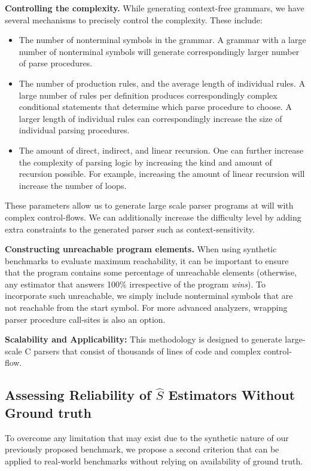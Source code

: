 \documentclass[conference,anonymous,review]{IEEEtran}
\begin{document}
\noindent\textbf{Controlling the complexity.} 
While generating context-free grammars, we have several mechanisms to
precisely control the complexity. These include:
\begin{itemize}
\item The number of nonterminal symbols in the grammar. A grammar with a large number of nonterminal symbols will generate correspondingly larger number of parse procedures.
\item The number of production rules, and the average length of individual rules. A large number of rules per definition produces correspondingly complex conditional statements that determine which parse procedure to choose. A larger length of individual rules can correspondingly increase the size of individual parsing procedures.
\item The amount of direct, indirect, and linear recursion. One can further increase the complexity of parsing logic by increasing the kind and amount of recursion possible. For example, increasing the amount of linear recursion will increase the number of loops.
\end{itemize}

These parameters allow us to generate large scale parser programs at will with
complex control-flows. We can additionally increase the difficulty level by
adding extra constraints to the generated parser such
as context-sensitivity.

\noindent\textbf{Constructing unreachable program elements.} When using synthetic
benchmarks to evaluate maximum reachability, it can be important to ensure that the
program contains some percentage of unreachable elements (otherwise, any estimator
that answers 100\% irrespective of the program \emph{wins}). To incorporate such
unreachable, we simply include nonterminal symbols that are not reachable from the
start symbol. For more advanced analyzers, wrapping parser procedure call-sites is
also an option.


\noindent\textbf{Scalability and Applicability:} This methodology is designed to generate large-scale C parsers that consist of thousands of lines of code and complex control-flow.

\subsection{Assessing Reliability of \texorpdfstring{$\hat{S}$}{S-hat} Estimators Without Ground truth}
To overcome any limitation that may exist due to the synthetic nature of our
previously proposed benchmark, we propose a second criterion that can be applied
to real-world benchmarks without relying on availability of ground truth.
\end{document}
